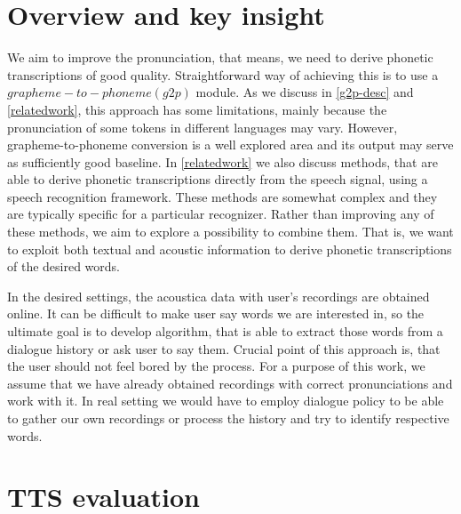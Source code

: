 \section{Overview and key insight}
We aim to improve the pronunciation, that means, we need to derive phonetic transcriptions of good quality. Straightforward way of achieving this is to use a $grapheme-to-phoneme (g2p)$ module. As we discuss in \ref{g2p-desc} and \ref{relatedwork}, this approach has some limitations, mainly because the pronunciation of some tokens in different languages may vary. However, grapheme-to-phoneme conversion is a well explored area and its output may serve as sufficiently good baseline. In \ref{relatedwork} we also discuss methods, that are able to derive phonetic transcriptions directly from the speech signal, using a speech recognition framework. These methods are somewhat complex and they are typically specific for a particular recognizer. Rather than improving any of these methods, we aim to explore a possibility to combine them. That is, we want to exploit both textual and acoustic information to derive phonetic transcriptions of the desired words.
\par
In the desired settings, the acoustica data with user's recordings are obtained online. It can be difficult to make user say words we are interested in, so the ultimate goal is to develop algorithm, that is able to extract those words from a dialogue history or ask user to say them. Crucial point of this approach is, that the user should not feel bored by the process. For a purpose of this work, we assume that we have already obtained recordings with correct pronunciations and work with it. In real setting we would have to employ dialogue policy to be able to gather our own recordings or process the history and try to identify respective words.
\section{TTS evaluation}